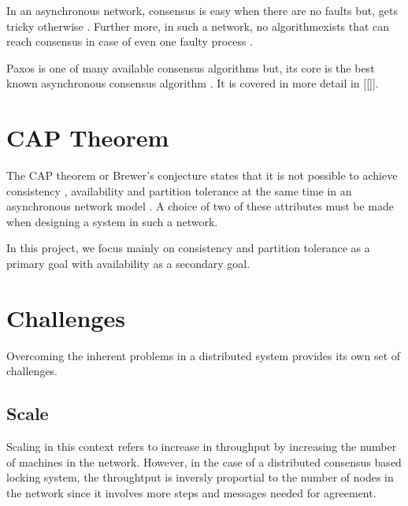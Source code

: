 In an asynchronous network, consensus is easy when there are no faults but, 
gets tricky otherwise \citep{Lampson:1996:HBH}. Further more, in such a network,
no algorithmexists that can reach consensus in case of even one faulty process
\citep{FisLynPat85}.

Paxos is one of many available consensus algorithms but, its core is the best
known asynchronous consensus algorithm \citep{Lampson:1996:HBH}. It is covered
in more detail in [[]].

\section{CAP Theorem}

The CAP theorem or Brewer's conjecture states that it is not 
possible to achieve consistency%
, availability%
and partition tolerance%
at the same time in an asynchronous network model
\citep{journals/sigact/GilbertL02}. A choice of two of these attributes must
be made when designing a system in such a network.

In this project, we focus mainly on consistency and partition tolerance 
as a primary goal with availability as a secondary goal.

\section{Challenges}

Overcoming the inherent problems in a distributed system provides its own set of
challenges.

\subsection{Scale}

Scaling in this context refers to increase in throughput by increasing the
number of machines in the network. However, in the case of a distributed 
consensus based locking system, the throughtput is inversly proportial to the 
number of nodes in the network since it involves more steps and messages needed 
for agreement.

